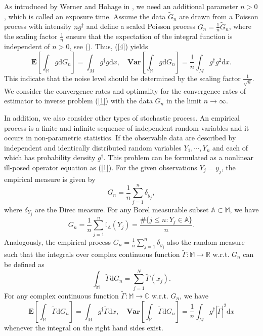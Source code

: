 \documentclass[10pt]{iopart}
\begin{document}
As introduced by Werner and Hohage in \cite{Hohage2016}, we need an additional parameter $n>0$, which is called an exposure time. 
Assume the data $\widetilde{G}_{n}$ are drawn from a Poisson process with intensity $ng^{\dagger}$ and define a scaled Poisson process
$G_{n}=\frac{1}{n}\widetilde{G}_{n}$, where the scaling factor $\frac{1}{n}$ ensure that the expectation of the integral function is 
independent of $n>0$, see (\cite{Hohage2016}). Thus, (\ref{4}) yields
\begin{equation}\label{5}
\mathbf{E}\left[\int_{\mathbb{M}}g\mathrm{d}G_{n}\right]=\int_{M} g^{\dagger}g\mathrm{d}x, \quad \mathbf{Var}
\left[\int_{\mathbb{M}}g\mathrm{d}G_{n}\right]=\frac{1}{n}\int_{M} g^{\dagger}g^{2}\mathrm{d}x.
\end{equation}
This indicate that the noise level should be determined by the scaling factor $\frac{1}{\sqrt{n}}$.
We consider the convergence rates and optimality for the convergence rates of estimator to inverse problem (\ref{1})
with the data $G_{n}$ in the limit $n\rightarrow \infty$. 


In addition, we also consider other types of stochastic process. An empirical process is a finite and infinite sequence of independent
random variables and it occurs in non-parametric statistics. If the observable data are described by independent and identically distributed random
variables $Y_{1}, \cdots, Y_{n}$ and each of which has probability density $g^{\dagger}$. This problem can be formulated as a nonlinear ill-posed
operator equation as (\ref{1}). For the given observations $Y_{j}=y_{j}$, the empirical measure is given by
\begin{equation}
G_{n}=\frac{1}{n}\sum_{j=1}^{n}\delta_{y_{j}},
\end{equation}
where $\delta_{Y_{j}}$ are the Direc measure. For any Borel measurable subset $\mathbb{A}\subset \mathbb{M}$, we have
\begin{equation*}
G_{n}=\frac{1}{n}\sum_{j=1}^{n}\mathbb{I}_{\mathbb{A}}(Y_{j})=\frac{\#\{j\leq n: Y_{j}\in\mathbb{A}\}}{n}.
\end{equation*}
Analogously, the empirical process $G_{n}=\frac{1}{n}\sum_{j=1}^{n}\delta_{y_{j}}$ also the random measure such that 
the integrals over complex continuous function $\tilde{\Gamma}: \mathbb{M}\rightarrow \mathbb{R}$ w.r.t. $G_{n}$ can be defined as 
\begin{equation*}
\int_{\mathbb{M}}\tilde{\Gamma}\mathrm{d}G_{n}=\sum_{j=1}^{N}\tilde{\Gamma}(x_{j}).
\end{equation*}
For any complex continuous function $\tilde{\Gamma}: \mathbb{M}\rightarrow\mathbb{C}$ w.r.t. $G_{n}$, we have
\begin{equation}
\mathbf{E}\left[\int_{\mathbb{M}}\tilde{\Gamma}\mathrm{d}G_{n}\right]=\int_{M} g^{\dagger}\tilde{\Gamma}\mathrm{d}x, \quad \mathbf{Var}
\left[\int_{\mathbb{M}}\tilde{\Gamma}\mathrm{d}G_{n}\right]=\frac{1}{n}\int_{M} g^{\dagger}|\tilde{\Gamma}|^{2}\mathrm{d}x
\end{equation}
whenever the integral on the right hand sides exist.
\end{document}
